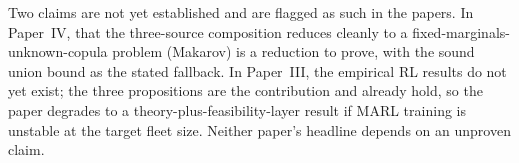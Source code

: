 \documentclass[11pt,a4paper]{article}
\begin{document}
\begin{honestly}
Two claims are not yet established and are flagged as such in the papers. In
Paper~IV, that the three-source composition reduces cleanly to a
fixed-marginals-unknown-copula problem (Makarov) is a reduction to prove, with
the sound union bound as the stated fallback. In Paper~III, the empirical RL
results do not yet exist; the three propositions are the contribution and already
hold, so the paper degrades to a theory-plus-feasibility-layer result if MARL
training is unstable at the target fleet size. Neither paper's headline depends
on an unproven claim.
\end{honestly}
\end{document}

